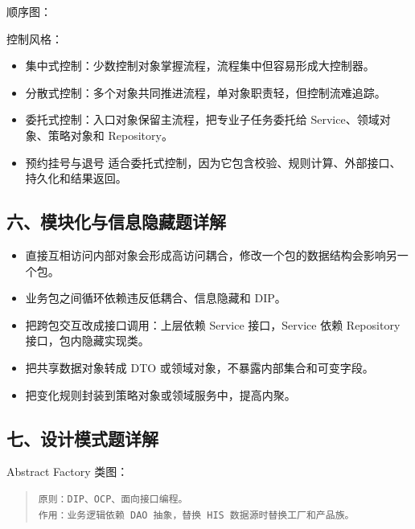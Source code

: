 \documentclass[UTF8,zihao=-4]{ctexart}
\begin{document}
顺序图：





控制风格：


\begin{itemize}
\item 集中式控制：少数控制对象掌握流程，流程集中但容易形成大控制器。
\item 分散式控制：多个对象共同推进流程，单对象职责轻，但控制流难追踪。
\item 委托式控制：入口对象保留主流程，把专业子任务委托给 Service、领域对象、策略对象和 Repository。
\item 预约挂号与退号 适合委托式控制，因为它包含校验、规则计算、外部接口、持久化和结果返回。
\end{itemize}



\subsection{六、模块化与信息隐藏题详解}


\begin{itemize}
\item 直接互相访问内部对象会形成高访问耦合，修改一个包的数据结构会影响另一个包。
\item 业务包之间循环依赖违反低耦合、信息隐藏和 DIP。
\item 把跨包交互改成接口调用：上层依赖 Service 接口，Service 依赖 Repository 接口，包内隐藏实现类。
\item 把共享数据对象转成 DTO 或领域对象，不暴露内部集合和可变字段。
\item 把变化规则封装到策略对象或领域服务中，提高内聚。
\end{itemize}



\subsection{七、设计模式题详解}


Abstract Factory 类图：

\ExamAbstractFactoryDiagram

\begin{quote}
\footnotesize
\begin{verbatim}
原则：DIP、OCP、面向接口编程。
作用：业务逻辑依赖 DAO 抽象，替换 HIS 数据源时替换工厂和产品族。
\end{verbatim}
\end{quote}
\end{document}
